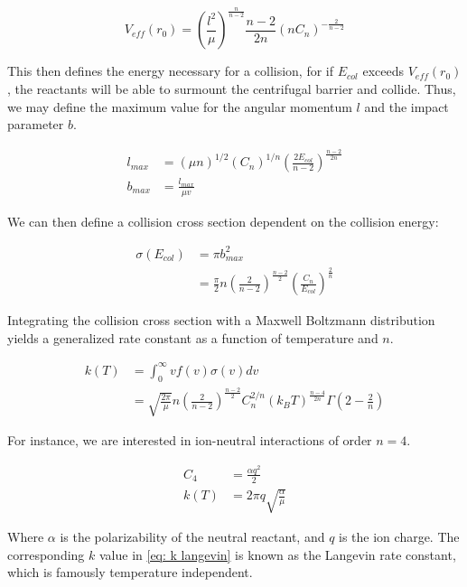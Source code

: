 \begin{equation}
    V_{eff}(r_0) = \left(\frac{l^2}{\mu}\right)^{\frac{n}{n-2}} \frac{n-2}{2n}(n C_n)^{-\frac{2}{n-2}}
\end{equation}

This then defines the energy necessary for a collision, for if $E_{col}$ exceeds $V_{eff}(r_0)$, the reactants will be able to surmount the centrifugal barrier and collide. Thus, we may define the maximum value for the angular momentum $l$ and the impact parameter $b$.

\begin{align*}
    l_{max} & = (\mu n)^{1/2}(C_n)^{1/n} \left(\frac{2 E_{col}}{n-2}\right)^{\frac{n-2}{2n}} \\
    b_{max} & = \frac{l_{max}}{\mu v}
\end{align*}

We can then define a collision cross section dependent on the collision energy:

\begin{align*}
    \sigma(E_{col}) & = \pi b^2_{max} \\
    & = \frac{\pi}{2} n \left(\frac{2}{n-2}\right)^{\frac{n-2}{2}} \left(\frac{C_n}{E_{col}}\right)^{\frac{2}{n}}
\end{align*}

Integrating the collision cross section with a Maxwell Boltzmann distribution yields a generalized rate constant as a function of temperature and $n$.

\begin{align}
    k(T) & = \int_0^{\infty} v f(v) \sigma(v) dv \label{eq: k int} \\
    & = \sqrt{\frac{2 \pi}{\mu}}n\left(\frac{2}{n-2}\right)^{\frac{n-2}{2}}C_n^{2/n}(k_B T)^{\frac{n-4}{2n}}\Gamma\left(2-\frac{2}{n}\right) \label{eq: k(T)}
\end{align}

For instance, we are interested in ion-neutral interactions of order $n=4$.

\begin{align}
	C_4 & = \frac{\alpha q^2}{2} \nonumber \\
	k(T) & = 2\pi q \sqrt{\frac{\alpha}{\mu}} \label{eq: k langevin}
\end{align}

Where $\alpha$ is the polarizability of the neutral reactant, and $q$ is the ion charge. The corresponding $k$ value in \cref{eq: k langevin} is known as the Langevin rate constant, which is famously temperature independent.

